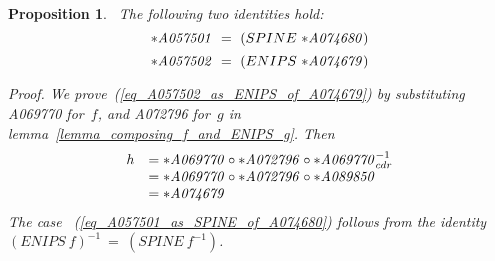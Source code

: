 \documentclass[11pt]{article} %
\newtheorem{propo}{Proposition}
\newcommand{\eqn}[1]{(\ref{#1})}
\newcommand{\eeq}{\end{equation}}
\newcommand{\beql}[1]{\begin{equation}\label{#1}}
\newcommand{\autname}[1]{{\it *#1}}
\newcommand{\funapply}{\ensuremath{\circ}}
\begin{document}


\begin{propo}~\label{propo_A057501_as_SPINE_of_A074680}
\normalfont
The following two identities hold:
\beql{eq_A057501_as_SPINE_of_A074680}
\autname{A057501}~=~(SPINE~\autname{A074680})
\eeq
\beql{eq_A057502_as_ENIPS_of_A074679}
\autname{A057502}~=~(ENIPS~\autname{A074679})
\eeq

\textit{Proof}.
We prove~\eqn{eq_A057502_as_ENIPS_of_A074679} by
substituting \autname{A069770} for~$f$,
and \autname{A072796} for~$g$ in lemma~\ref{lemma_composing_f_and_ENIPS_g}.
Then
\beql{A057502_as_ENIPS_of_A074679}
\begin{array}{l l}
h & = \autname{A069770} \funapply \autname{A072796} \funapply \autname{A069770}^{-1}_{cdr} \\
  & = \autname{A069770} \funapply \autname{A072796} \funapply \autname{A089850} \\
  & = \autname{A074679}
\end{array}
\eeq
The case ~\eqn{eq_A057501_as_SPINE_of_A074680} follows from the identity
$(ENIPS~f)^{-1}~=~(SPINE~f^{-1})$.
\end{propo}
\end{document}
